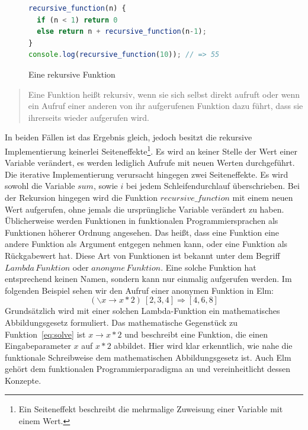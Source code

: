 \begin{figure}[h!]
\begin{lstlisting}[language=JavaScript]
recursive_function(n) {
  if (n < 1) return 0
  else return n + recursive_function(n-1);
}
console.log(recursive_function(10)); // => 55
\end{lstlisting}
\caption{Eine rekursive Funktion}\label{fig:recursive-function}
\end{figure}
\begin{quote}
\glqq Eine Funktion heißt rekursiv, wenn sie sich selbst direkt aufruft oder wenn ein Aufruf einer anderen von ihr aufgerufenen Funktion dazu führt, dass sie ihrerseits wieder aufgerufen wird.\grqq\cite{rekursive-funktion}
\end{quote}
In beiden Fällen ist das Ergebnis gleich, jedoch besitzt die rekursive Implementierung keinerlei Seiteneffekte\footnote{Ein Seiteneffekt beschreibt die mehrmalige Zuweisung einer Variable mit einem Wert.}. Es wird an keiner Stelle der Wert einer Variable verändert, es werden lediglich Aufrufe mit neuen Werten durchgeführt. Die iterative Implementierung verursacht hingegen zwei Seiteneffekte. Es wird sowohl die Variable $sum$, sowie $i$ bei jedem Schleifendurchlauf überschrieben. Bei der Rekursion hingegen wird  die Funktion $recursive\_function$
mit einem neuen Wert aufgerufen, ohne jemals die ursprüngliche Variable verändert zu haben.
Üblicherweise werden Funktionen in funktionalen Programmiersprachen als Funktionen höherer Ordnung angesehen. Das heißt, dass eine Funktion eine andere Funktion als Argument entgegen nehmen kann, oder eine Funktion als Rückgabewert hat. Diese Art von Funktionen ist bekannt unter dem Begriff $Lambda\,Funktion$ oder $anonyme\,Funktion$. Eine solche Funktion hat entsprechend keinen Namen, sondern kann nur einmalig aufgerufen werden. Im folgenden Beispiel sehen wir den Aufruf einer anonymen Funktion in Elm:
\begin{equation} \label{eq:solve}
(\backslash x \rightarrow x * 2)\ [ 2, 3, 4 ] \Longrightarrow [4, 6, 8]
\end{equation}
Grundsätzlich wird mit einer solchen Lambda-Funktion ein mathematisches Abbildungsgesetz formuliert. Das mathematische Gegenstück zu Funktion~\ref{eq:solve} ist $x \rightarrow x * 2$ und beschreibt eine Funktion, die einen Eingabeparameter $x$ auf $x*2$ abbildet. Hier wird klar erkenntlich, wie nahe die funktionale Schreibweise dem mathematischen Abbildungsgesetz ist. Auch Elm gehört dem funktionalen Programmierparadigma an und vereinheitlicht dessen Konzepte.

